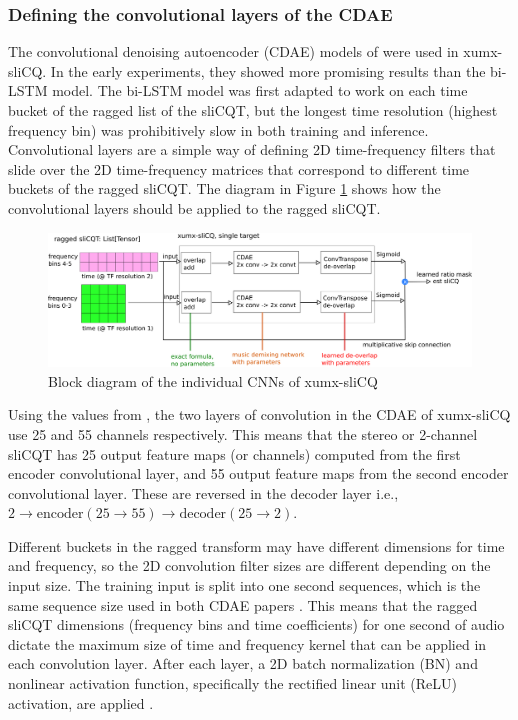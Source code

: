 \documentclass[report.tex]{subfiles}
\begin{document}
\subsubsection{Defining the convolutional layers of the CDAE}
\label{sec:convlayers}

The convolutional denoising autoencoder (CDAE) models of \textcite{plumbley1, plumbley2} were used in xumx-sliCQ. In the early experiments, they showed more promising results than the bi-LSTM model. The bi-LSTM model was first adapted to work on each time bucket of the ragged list of the sliCQT, but the longest time resolution (highest frequency bin) was prohibitively slow in both training and inference. Convolutional layers are a simple way of defining 2D time-frequency filters that slide over the 2D time-frequency matrices that correspond to different time buckets of the ragged sliCQT. The diagram in Figure \ref{fig:cdaeslicqt} shows how the convolutional layers should be applied to the ragged sliCQT.

\begin{figure}[ht]
	\centering
	\includegraphics[width=\textwidth]{./images-blockdiagrams/xumx_slicq_pertarget_largefont.png}
	\caption{Block diagram of the individual CNNs of xumx-sliCQ}
	\label{fig:cdaeslicqt}
\end{figure}

Using the values from \textcite{plumbley2}, the two layers of convolution in the CDAE of xumx-sliCQ use 25 and 55 channels respectively. This means that the stereo or 2-channel sliCQT has 25 output feature maps (or channels) computed from the first encoder convolutional layer, and 55 output feature maps from the second encoder convolutional layer. These are reversed in the decoder layer i.e., $2 \rightarrow \text{encoder}(25 \rightarrow 55) \rightarrow \text{decoder}(25 \rightarrow 2)$.

Different buckets in the ragged transform may have different dimensions for time and frequency, so the 2D convolution filter sizes are different depending on the input size. The training input is split into one second sequences, which is the same sequence size used in both CDAE papers \parencite{plumbley1, plumbley2}. This means that the ragged sliCQT dimensions (frequency bins and time coefficients) for one second of audio dictate the maximum size of time and frequency kernel that can be applied in each convolution layer. After each layer, a 2D batch normalization (BN) and nonlinear activation function, specifically the rectified linear unit (ReLU) activation, are applied \parencite{plumbley2}.
\end{document}
